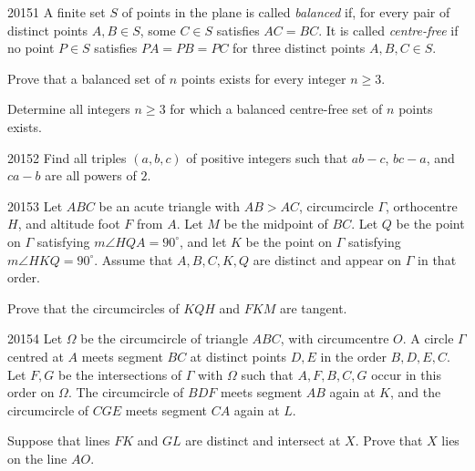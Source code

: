 
\begin{problem}{2015}{1}
A finite set $S$ of points in the plane is called \emph{balanced} if, for every pair of distinct points $A, B\in S$, some $C\in S$ satisfies $AC=BC$. It is called \emph{centre-free} if no point $P\in S$ satisfies $PA=PB=PC$ for three distinct points $A, B, C\in S$.
\begin{problemsubparts}
    \item Prove that a balanced set of $n$ points exists for every integer $n\geq3$.
    \item Determine all integers $n\geq3$ for which a balanced centre-free set of $n$ points exists.
\end{problemsubparts}
\end{problem}

\begin{problem}{2015}{2}
Find all triples $(a, b, c)$ of positive integers such that $ab-c$, $bc-a$, and $ca-b$ are all powers of $2$.
\end{problem}

\begin{problem}{2015}{3}
Let $ABC$ be an acute triangle with $AB>AC$, circumcircle $\Gamma$, orthocentre $H$, and altitude foot $F$ from $A$. Let $M$ be the midpoint of $BC$. Let $Q$ be the point on $\Gamma$ satisfying $m\angle HQA=90^\circ$, and let $K$ be the point on $\Gamma$ satisfying $m\angle HKQ=90^\circ$. Assume that $A, B, C, K, Q$ are distinct and appear on $\Gamma$ in that order.

Prove that the circumcircles of $KQH$ and $FKM$ are tangent.
\end{problem}

\begin{problem}{2015}{4}
Let $\Omega$ be the circumcircle of triangle $ABC$, with circumcentre $O$. A circle $\Gamma$ centred at $A$ meets segment $BC$ at distinct points $D, E$ in the order $B, D, E, C$. Let $F, G$ be the intersections of $\Gamma$ with $\Omega$ such that $A, F, B, C, G$ occur in this order on $\Omega$. The circumcircle of $BDF$ meets segment $AB$ again at $K$, and the circumcircle of $CGE$ meets segment $CA$ again at $L$.

Suppose that lines $FK$ and $GL$ are distinct and intersect at $X$. Prove that $X$ lies on the line $AO$.
\end{problem}

